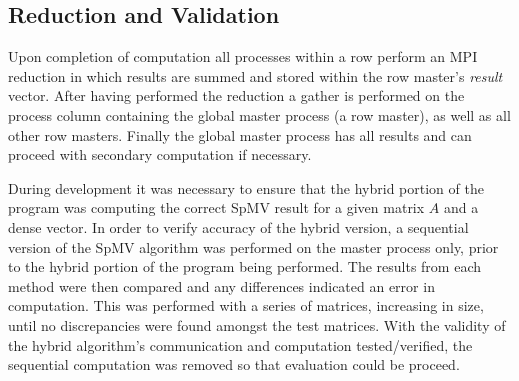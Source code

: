 \subsection{Reduction and Validation}

Upon completion of computation all processes within a row perform an MPI reduction in which results are summed and stored within the row master's \emph{result} vector.
After having performed the reduction a gather is performed on the process column containing the global master process (a row master), as well as all other row masters.
Finally the global master process has all results and can proceed with secondary computation if necessary. 

During development it was necessary to ensure that the hybrid portion of the program was computing the correct SpMV result for a given matrix $A$ and a dense vector.
In order to verify accuracy of the hybrid version, a sequential version of the SpMV algorithm was performed on the master process only, prior to the hybrid portion of the program being performed.
The results from each method were then compared and any differences indicated an error in computation.
This was performed with a series of matrices, increasing in size, until no discrepancies were found amongst the test matrices. 
With the validity of the hybrid algorithm's communication and computation tested/verified, the sequential computation was removed so that evaluation could be proceed. 

